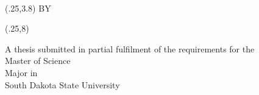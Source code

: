 \documentclass[main.tex]{subfiles}
\begin{document}
\begin{titlepage}
\center

\yourtitle\\

\begin{textblock}{8.5}(.25,3.8)
    \centering
    BY\\[1ex]
    \yourname  
\end{textblock}

\begin{textblock}{8.5}(.25,8)
    \centering
    
    A thesis submitted in partial fulfilment of the requirements for the\\[.9ex]
    Master of Science\\[.9ex]
    Major in \yourmajor\\ [.9ex]
    South Dakota State University\\ [.9ex]
    \number\year
\end{textblock}

\end{titlepage}
\end{document}
